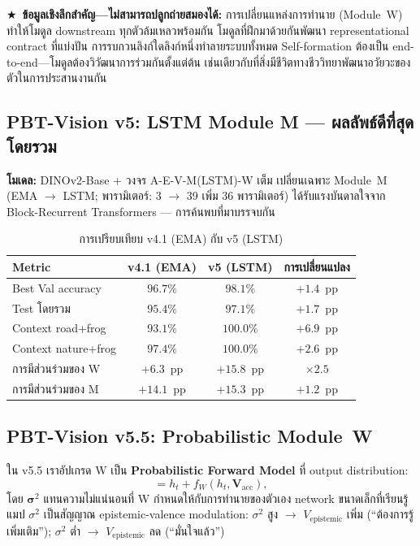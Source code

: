 \documentclass[12pt,a4paper]{article}
\newcommand{\Vacc}{\mathbf{V}_{\mathrm{acc}}}
\newcommand{\vepi}{V_{\mathrm{epistemic}}}
\newcommand{\starred}{\textbf{\textcolor{pbtblue}{$\bigstar$}}~}
\begin{document}
\starred\textbf{ข้อมูลเชิงลึกสำคัญ---ไม่สามารถปลูกถ่ายสมองได้:}
การเปลี่ยนแหล่งการทำนาย (Module~W) ทำให้โมดูล downstream ทุกตัวล้มเหลวพร้อมกัน
โมดูลที่ฝึกมาด้วยกันพัฒนา representational contract ที่แบ่งปัน
การรบกวนลิงก์ใดลิงก์หนึ่งทำลายระบบทั้งหมด
Self-formation ต้องเป็น end-to-end---โมดูลต้องวิวัฒนาการร่วมกันตั้งแต่ต้น
เช่นเดียวกับที่สิ่งมีชีวิตทางชีววิทยาพัฒนาอวัยวะของตัวในการประสานงานกัน

\subsection{PBT-Vision v5: LSTM Module M --- ผลลัพธ์ดีที่สุดโดยรวม}

\textbf{โมเดล:} DINOv2-Base + วงจร A-E-V-M(LSTM)-W เต็ม
เปลี่ยนเฉพาะ Module~M (EMA $\to$ LSTM; พารามิเตอร์: 3 $\to$ 39 เพิ่ม 36 พารามิเตอร์)
ได้รับแรงบันดาลใจจาก Block-Recurrent Transformers \citep{hutchins2022}---
การค้นพบที่มาบรรจบกัน

\begin{table}[!htbp]
\centering
\caption{การเปรียบเทียบ v4.1 (EMA) กับ v5 (LSTM)}
\label{tab:v5_compare}
\small
\begin{tabular}{@{}lccc@{}}
\toprule
\textbf{Metric} & \textbf{v4.1 (EMA)} & \textbf{v5 (LSTM)} & \textbf{การเปลี่ยนแปลง}\\
\midrule
Best Val accuracy    & $96.7\%$ & $\mathbf{98.1\%}$  & $+1.4$~pp \\
Test โดยรวม         & $95.4\%$ & $97.1\%$  & $+1.7$~pp \\
Context road+frog    & $93.1\%$ & $\mathbf{100.0\%}$ & $+6.9$~pp \\
Context nature+frog  & $97.4\%$ & $100.0\%$ & $+2.6$~pp \\
การมีส่วนร่วมของ W       & $+6.3$~pp & $+15.8$~pp & $\times 2.5$ \\
การมีส่วนร่วมของ M       & $+14.1$~pp & $+15.3$~pp & $+1.2$~pp \\
\bottomrule
\end{tabular}
\end{table}

\subsection{PBT-Vision v5.5: Probabilistic Module~W}
\label{sec:v55}

ใน v5.5 เราอัปเกรด W เป็น \textbf{Probabilistic Forward Model}
ที่ output distribution:
\begin{equation}
[\bm{\mu}_{t+1},\;\log\bm{\sigma}^2_{t+1}] = h_t + f_W(h_t, \Vacc),
\end{equation}
โดย $\bm{\sigma}^2$ แทนความไม่แน่นอนที่ W กำหนดให้กับการทำนายของตัวเอง
network ขนาดเล็กที่เรียนรู้แมป $\sigma^2$ เป็นสัญญาณ epistemic-valence modulation:
$\sigma^2$ สูง $\to$ $\vepi$ เพิ่ม (``ต้องการรู้เพิ่มเติม'');
$\sigma^2$ ต่ำ $\to$ $\vepi$ ลด (``มั่นใจแล้ว'')
\end{document}
